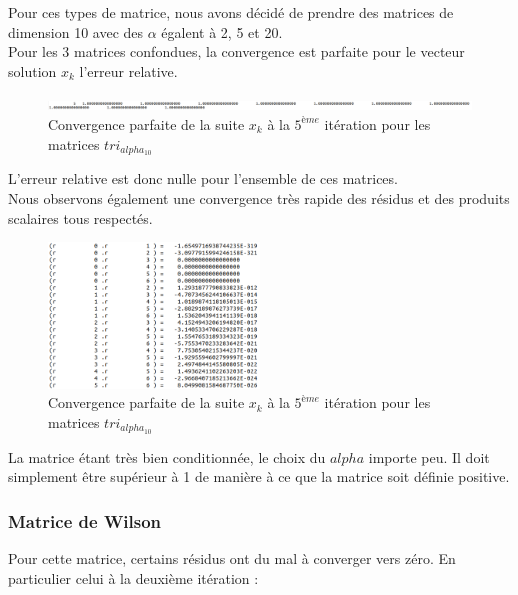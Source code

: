 \documentclass[12,french]{report}
\begin{document}
Pour ces types de matrice, nous avons décidé de prendre des matrices de dimension 10 avec des $\alpha$ égalent à 2, 5 et 20.\\

Pour les 3 matrices confondues, la convergence est parfaite pour le vecteur solution $x_k$ l'erreur relative. \\

\begin{figure}[H]
	\centering
	\includegraphics[width=1\textwidth]{./Images/x_tri}
	\caption{Convergence parfaite de la suite $x_k$ à la $5^{ème}$ itération pour les matrices $tri_{alpha_{10}}$}
\end{figure}\vspace{0.2cm}

L'erreur relative est donc nulle pour l'ensemble de ces matrices.\\

Nous observons également une convergence très rapide des résidus et des produits scalaires tous respectés.\\

\begin{figure}[H]
	\centering
	\includegraphics[width=0.5\textwidth]{./Images/ps_tri_20_10}
	\caption{Convergence parfaite de la suite $x_k$ à la $5^{ème}$ itération pour les matrices $tri_{alpha_{10}}$}
\end{figure}\vspace{0.2cm}

La matrice étant très bien conditionnée, le choix du $alpha$ importe peu. Il doit simplement être supérieur à 1 de manière à ce que la matrice soit définie positive.

\subsubsection{Matrice de Wilson}

Pour cette matrice, certains résidus ont du mal à converger vers zéro. En particulier celui à la deuxième itération :\\
\end{document}
